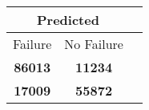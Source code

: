 \begin{tabular} 
 {@{}ccc@{}} 
\toprule 
\multicolumn{2}{c}{\textbf{Predicted}}
 \\ \midrule 
\multicolumn{1}{|c|}{Failure} & 
\multicolumn{1}{c|}{No Failure}
 \\ \midrule 
\multicolumn{1}{|c|}{\color{green}\textbf{86013}} & 
\multicolumn{1}{c|}{\color{red}\textbf{11234}}
 \\ \midrule 
\multicolumn{1}{|c|}{\color{red}\textbf{17009}} & 
\multicolumn{1}{c|}{\color{green}\textbf{55872}}
 \\ \bottomrule 
\end{tabular} 
